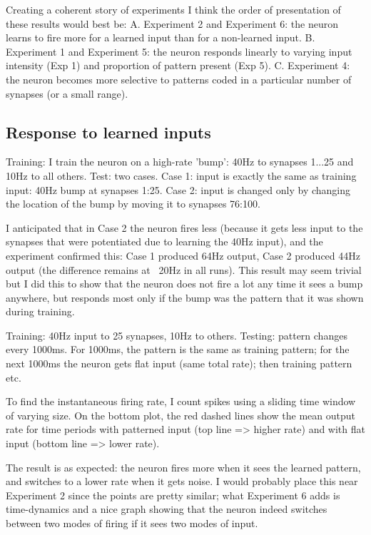 \documentclass[a4paper,12pt]{report}
\theoremstyle{definition}
\begin{document}
Creating a coherent story of experiments
I think the order of presentation of these results would best be:
A. Experiment 2 and Experiment 6: the neuron learns to fire more for a learned input than for a non-learned input.
B. Experiment 1 and Experiment 5: the neuron responds linearly to varying input intensity (Exp 1) and proportion of pattern present (Exp 5).
C. Experiment 4: the neuron becomes more selective to patterns coded in a particular number of synapses (or a small range).

\clearpage %
\subsection{Response to learned inputs}


Training: I train the neuron on a high-rate 'bump': 40Hz to synapses 1...25 and 10Hz to all others.
Test: two cases.
Case 1: input is exactly the same as training input: 40Hz bump at synapses 1:25.
Case 2: input is changed only by changing the location of the bump by moving it to synapses 76:100.

I anticipated that in Case 2 the neuron fires less (because it gets less input to the synapses that were potentiated due to learning the 40Hz input), and the experiment confirmed this: Case 1 produced 64Hz output, Case 2 produced 44Hz output (the difference remains at ~20Hz in all runs).
This result may seem trivial but I did this to show that the neuron does not fire a lot any time it sees a bump anywhere, but responds most only if the bump was the pattern that it was shown during training.


Training: 40Hz input to 25 synapses, 10Hz to others.
Testing: pattern changes every 1000ms. For 1000ms, the pattern is the same as training pattern; for the next 1000ms the neuron gets flat input (same total rate); then training pattern etc.

To find the instantaneous firing rate, I count spikes using a sliding time window of varying size.
On the bottom plot, the red dashed lines show the mean output rate for time periods with patterned input (top line => higher rate) and with flat input (bottom line => lower rate).

The result is as expected: the neuron fires more when it sees the learned pattern, and switches to a lower rate when it gets noise.
I would probably place this near Experiment 2 since the points are pretty similar; what Experiment 6 adds is time-dynamics and a nice graph showing that the neuron indeed switches between two modes of firing if it sees two modes of input.
\end{document}
